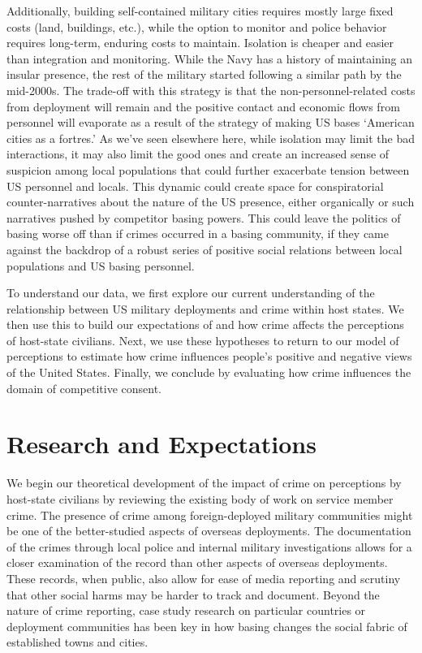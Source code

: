 Additionally, building self-contained military cities requires mostly large fixed costs (land, buildings, etc.), while the option to monitor and police behavior requires long-term, enduring costs to maintain. Isolation is cheaper and easier than integration and monitoring. While the Navy has a history of maintaining an insular presence, the rest of the military started following a similar path by the mid-2000s.\cite{Gillem2007} The trade-off with this strategy is that the non-personnel-related costs from deployment will remain and the positive contact and economic flows from personnel will evaporate as a result of the strategy of making US bases `American cities as a fortres.' As we've seen elsewhere here, while isolation may limit the bad interactions, it may also limit the good ones and create an increased sense of suspicion among local populations that could further exacerbate tension between US personnel and locals. This dynamic could create space for conspiratorial counter-narratives about the nature of the US presence, either organically or such narratives pushed by competitor basing powers. This could leave the politics of basing worse off than if crimes occurred in a basing community, if they came against the backdrop of a robust series of positive social relations between local populations and US basing personnel.

To understand our data, we first explore our current understanding of the relationship between US military deployments and crime within host states. We then use this to build our expectations of and how crime affects the perceptions of host-state civilians. Next, we use these hypotheses to return to our model of perceptions to estimate how crime influences people's positive and negative views of the United States. Finally, we conclude by evaluating how crime influences the domain of competitive consent.


\section*{Research and Expectations}

We begin our theoretical development of the impact of crime on perceptions by host-state civilians by reviewing the existing body of work on service member crime. The presence of crime among foreign-deployed military communities might be one of the better-studied aspects of overseas deployments. The documentation of the crimes through local police and internal military investigations allows for a closer examination of the record than other aspects of overseas deployments. These records, when public, also allow for ease of media reporting and scrutiny that other social harms may be harder to track and document. Beyond the nature of crime reporting, case study research on particular countries or deployment communities has been key in how basing changes the social fabric of established towns and cities.

